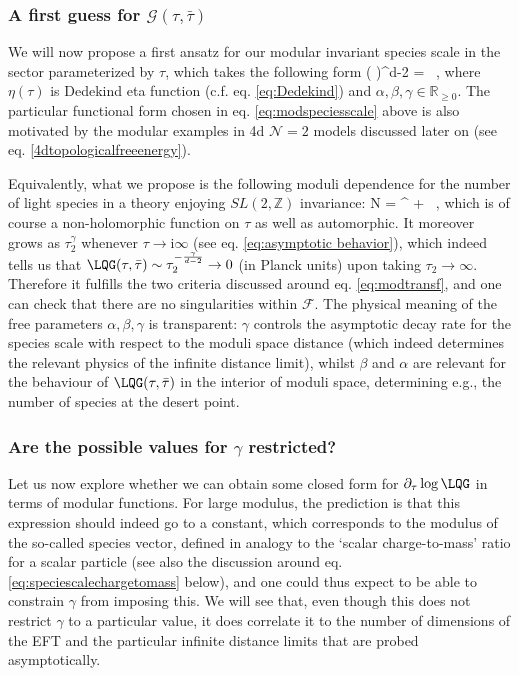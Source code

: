 \subsubsection*{A first guess for $\mathcal{G}(\tau, \bar \tau)$}
\label{ss:proposalf}

We will now propose a first ansatz for our modular invariant species scale in the sector parameterized by $\tau$, which takes the following form
%
\beq\label{eq:modspeciesscale}
\left( \frac{\LQG(\tau, \bar \tau)}{\Mpd} \right)^{d-2} = \, ,
\eeq
%
where $\eta(\tau)$ is Dedekind eta function (c.f. eq. \eqref{eq:Dedekind}) and $\alpha, \beta, \gamma \in \mathbb{R}_{\geq 0}$. The particular functional form chosen in eq. \eqref{eq:modspeciesscale} above is also motivated by the modular examples in 4d $\mathcal{N}=2$ models discussed later on (see eq. \eqref{4dtopologicalfreeenergy}). 

Equivalently, what we propose is the following moduli dependence for the number of light species in a theory enjoying $SL(2, \mathbb{Z})$ invariance:
%
\beq\label{eq:Nspecies}
N = \alpha {}^{\gamma} + \beta\, ,
\eeq
%
which is of course a non-holomorphic function on $\tau$ as well as automorphic. It moreover grows as $\tau_2^{\gamma}$ whenever $\tau \to \text{i} \infty$ (see eq. \eqref{eq:asymptotic behavior}), which indeed tells us that $\LQG(\tau, \bar \tau) \sim \tau_2^{-\frac{\gamma}{d-2}} \to 0$ (in Planck units) upon taking $\tau_2 \to \infty$. Therefore it fulfills the two criteria discussed around eq. \eqref{eq:modtransf}, and one can check that there are no singularities within $\mathcal{F}$. The physical meaning of the free parameters $\alpha, \beta, \gamma$ is transparent: $\gamma$ controls the asymptotic decay rate for the species scale with respect to the moduli space distance (which indeed determines the relevant physics of the infinite distance limit), whilst $\beta$ and $\alpha$ are relevant for the behaviour of $\LQG(\tau, \bar \tau)$ in the interior of moduli space, determining e.g., the number of species at the desert point\cite{vandeHeisteeg:2022btw}.

\subsubsection*{Are the possible values for $\gamma$ restricted?}
\label{ss:G2}
	
Let us now explore whether we can obtain some closed form for $\partial_{\tau} \log \LQG$ in terms of modular functions. For large modulus, the prediction is that this expression should indeed go to a constant, which corresponds to the modulus of the so-called species vector, defined in analogy to the `scalar charge-to-mass' ratio for a scalar particle \cite{Calderon-Infante:2023ler} (see also the discussion around eq. \eqref{eq:speciescalechargetomass} below), and one could thus expect to be able to constrain $\gamma$ from imposing this. We will see that, even though this does not restrict $\gamma$ to a particular value, it does correlate it to the number of dimensions of the EFT and the particular infinite distance limits that are probed asymptotically.
	
